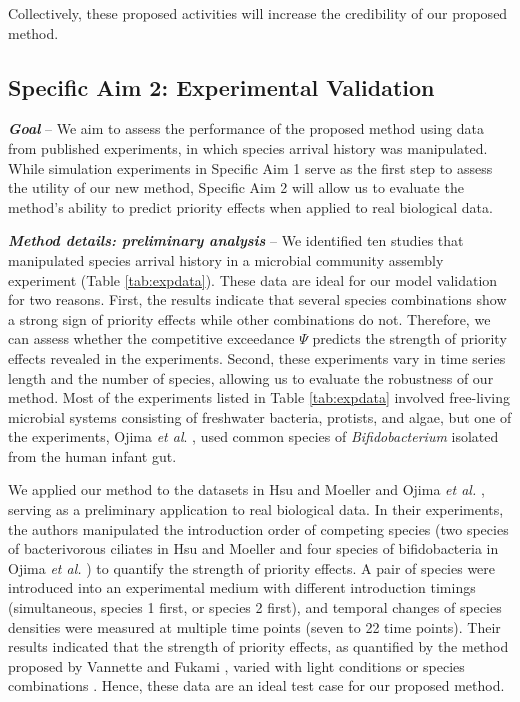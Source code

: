 \documentclass[12pt, class=article, crop=false]{standalone}
\begin{document}
Collectively, these proposed activities will increase the credibility of our proposed method.

\subsection*{Specific Aim 2: Experimental Validation}

\textbf{\textit{Goal}} -- 
We aim to assess the performance of the proposed method using data from published experiments, in which species arrival history was manipulated.
While simulation experiments in Specific Aim 1 serve as the first step to assess the utility of our new method, Specific Aim 2 will allow us to evaluate the method's ability to predict priority effects when applied to real biological data.

\textit{\textbf{Method details: preliminary analysis}} --
We identified ten studies that manipulated species arrival history in a microbial community assembly experiment (Table \ref{tab:expdata}).
These data are ideal for our model validation for two reasons.
First, the results indicate that several species combinations show a strong sign of priority effects while other combinations do not.
Therefore, we can assess whether the competitive exceedance $\Psi$ predicts the strength of priority effects revealed in the experiments.
Second, these experiments vary in time series length and the number of species, allowing us to evaluate the robustness of our method. 
Most of the experiments listed in Table \ref{tab:expdata} involved free-living microbial systems consisting of freshwater bacteria, protists, and algae, but one of the experiments, Ojima \textit{et al}. \citep{ojima_priority_2022}, used common species of \textit{Bifidobacterium} isolated from the human infant gut. 

We applied our method to the datasets in Hsu and Moeller \citep{hsu_metabolic_2021} and Ojima \textit{et al.} \citep{ojima_priority_2022}, serving as a preliminary application to real biological data.
In their experiments, the authors manipulated the introduction order of competing species (two species of bacterivorous ciliates in Hsu and Moeller \citep{hsu_metabolic_2021} and four species of bifidobacteria in Ojima \textit{et al.} \citep{ojima_priority_2022}) to quantify the strength of priority effects.
A pair of species were introduced into an experimental medium with different introduction timings (simultaneous, species 1 first, or species 2 first), and temporal changes of species densities were measured at multiple time points (seven to 22 time points).
Their results indicated that the strength of priority effects, as quantified by the method proposed by Vannette and Fukami \citep{vannette_historical_2014}, varied with light conditions \citep{hsu_metabolic_2021} or species combinations \citep{ojima_priority_2022}.
Hence, these data are an ideal test case for our proposed method.\newline
\newline
\end{document}

